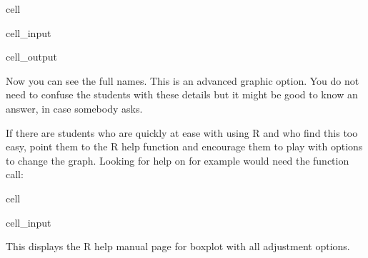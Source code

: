 \documentclass[letterpaper,10pt,english]{jupyterBook}
\begin{document}
\begin{sphinxuseclass}{cell}\begin{sphinxVerbatimInput}

\begin{sphinxuseclass}{cell_input}
\begin{sphinxVerbatim}[commandchars=\\\{\}]
\end{sphinxVerbatim}

\end{sphinxuseclass}\end{sphinxVerbatimInput}
\begin{sphinxVerbatimOutput}

\begin{sphinxuseclass}{cell_output}
\noindent{}

\end{sphinxuseclass}\end{sphinxVerbatimOutput}

\end{sphinxuseclass}
\sphinxAtStartPar
Now you can see the full names. This is an advanced graphic option. You do not need to confuse the students with these details but it might be good to know an answer, in case somebody asks.

\sphinxAtStartPar
If there are students who are quickly at ease with using R and who find this too easy, point them to the R help function and encourage them to play with options to change the graph. Looking for help on  for example would need the function call:

\begin{sphinxuseclass}{cell}\begin{sphinxVerbatimInput}

\begin{sphinxuseclass}{cell_input}
\begin{sphinxVerbatim}[commandchars=\\\{\}]
\end{sphinxVerbatim}

\end{sphinxuseclass}\end{sphinxVerbatimInput}

\end{sphinxuseclass}
\sphinxAtStartPar
This displays the R help manual page for boxplot with all adjustment options.
\end{document}
